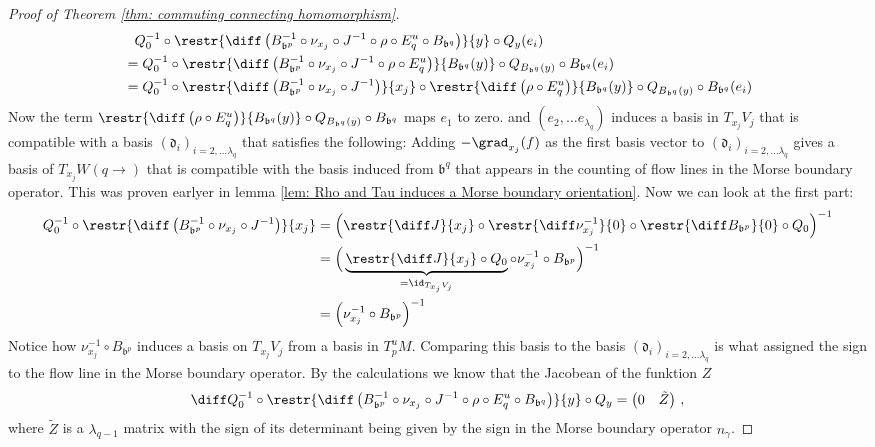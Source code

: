 \begin{proof}[Proof of Theorem \ref{thm: commuting connecting homomorphism}]
		
		\begin{align*}
			&\phantom{=}Q_0^{-1}\circ \restr{\diff \left(B_{\mathfrak{b}^p}^{-1} \circ \nu_{x_j}\circ J^{-1}\circ \rho \circ E^u_q\circ B_{\mathfrak{b}^q}\right)}{y}\circ Q_y (e_i)\\
			&=Q_0^{-1}\circ  \restr{\diff \left(B_{\mathfrak{b}^p}^{-1} \circ \nu_{x_j}\circ J^{-1}\circ \rho \circ E^u_q\right)}{B_{\mathfrak{b}^q}(y)}\circ Q_{B_{\mathfrak{b}^q}(y)}\circ B_{\mathfrak{b}^q}(e_i) \\
			&= Q_0^{-1}\circ \restr{\diff \left(B_{\mathfrak{b}^p}^{-1} \circ \nu_{x_j}\circ J^{-1}\right)}{x_j}\circ \restr{\diff \left( \rho \circ E^u_q\right)}{B_{\mathfrak{b}^q}(y)}\circ Q_{B_{\mathfrak{b}^q}(y)}\circ B_{\mathfrak{b}^q}(e_i)		
		\end{align*}
		Now the term $\restr{\diff \left( \rho \circ E^u_q\right)}{B_{\mathfrak{b}^q}(y)}\circ Q_{B_{\mathfrak{b}^q}(y)}\circ B_{\mathfrak{b}^q}$ maps $e_1$ to zero. and $(e_2,\dots e_{\lambda_q})$
		induces a basis in $T_{x_j}V_j$ that is compatible with a basis $(\mathfrak{d}_i)_{i=2,\dots \lambda_q}$ that satisfies the following: Adding $-\grad_{x_j}(f)$ as the first basis vector to $(\mathfrak{d}_i)_{i=2,\dots \lambda_q}$ gives a basis of $T_{x_j}W(q\to)$ that is compatible with the basis induced from $\mathfrak{b}^q$ that appears in the counting of flow lines in the Morse boundary operator. This was proven earlyer in lemma \ref{lem: Rho and Tau induces a Morse boundary orientation}.
		Now we can look at the first part: 
		\begin{align*}
			Q_0^{-1}\circ \restr{\diff \left(B_{\mathfrak{b}^p}^{-1} \circ \nu_{x_j}\circ J^{-1}\right)}{x_j}
			&=\Big(\restr{\diff J}{x_j}\circ \restr{\diff \nu_{x_j}^{-1}}{0}\circ \restr{\diff B_{\mathfrak{b}^p}}{0} \circ Q_0 \Big)^{-1}\\
			&=\Big(\underbrace{\restr{\diff J}{x_j}\circ Q_{0}}_{=\id_{T_{x_j}V_j}} \circ \nu_{x_j}^{-1}  \circ B_{\mathfrak{b}^p} \Big)^{-1}\\	
			&=\Big( \nu_{x_j}^{-1}  \circ B_{\mathfrak{b}^p} \Big)^{-1}
		\end{align*}
		Notice how $\nu_{x_j}^{-1}  \circ B_{\mathfrak{b}^p}$ induces a basis on $T_{x_j}V_j$ from a basis in $T^u_pM$. Comparing this basis to the basis  $(\mathfrak{d}_i)_{i=2,\dots \lambda_q}$ is what assigned the sign to the flow line in the Morse boundary operator. By the calculations we know that the Jacobean of the funktion $Z$ 
		\begin{equation*}
			\diff Q_0^{-1}\circ \restr{\diff \left(B_{\mathfrak{b}^p}^{-1} \circ \nu_{x_j}\circ J^{-1}\circ \rho \circ E^u_q\circ B_{\mathfrak{b}^q}\right)}{y}\circ Q_y=
			\begin{pmatrix}
				0&\tilde{Z}
			\end{pmatrix}\,,
		\end{equation*}where $\tilde{Z}$ is a $\lambda_{q-1}$ matrix with the sign of its determinant being given by the sign in the Morse boundary operator $n_{\gamma}$. 
		

\end{proof}
